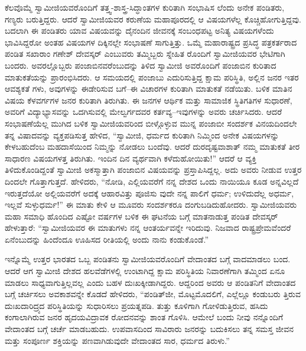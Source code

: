 ಕೆಲವೊಮ್ಮೆ ಸ್ವಾಮೀಜಿಯವರೊಂದಿಗೆ ತತ್ತ್ವ-ಶಾಸ್ತ್ರ-ಸಿದ್ಧಾಂತಗಳ ಕುರಿತಾಗಿ ಸಂಭಾಷಿಸ ಲೆಂದು ಅನೇಕ ಪಂಡಿತರು, ಗಣ್ಯರು ಬರುತ್ತಿದ್ದರು. ಆದರೆ ಸ್ವಾಮೀಜಿಯವರ ಕರುಣೆಯ ಮಹಾಪೂರದಲ್ಲಿ ಆ ವಿಷಯಗಳೆಲ್ಲ ಕೊಚ್ಚಿಹೋಗುತ್ತಿದ್ದವು. ಬದಲಾಗಿ ಈ ಪಂಡಿತರು ಯಾವ ವಿಷಯವನ್ನು ದೈನಂದಿನ ಜೀವನಕ್ಕೆ ಸಂಬಂಧಪಟ್ಟ ಅನಿತ್ಯ ವಿಷಯಗಳೆಂದು ಭಾವಿಸಿದ್ದರೋ ಅಂತಹ ವಿಷಯಗಳ ದಿಕ್ಕಿನಲ್ಲೇ ಸಂಭಾಷಣೆ ಸಾಗುತ್ತಿತ್ತು. ಒಮ್ಮೆ ಮಹಾರಾಷ್ಟ್ರದ ಪ್ರಸಿದ್ಧ ಪತ್ರಕರ್ತರಾದ ಪಂಡಿತ ಸಖಾರಾಂ ಗಣೇಶ್ ದೇವಸ್ಕರ್ ಎಂಬುವರು ತಮ್ಮಿಬ್ಬರು ಸ್ನೇಹಿತ ರೊಂದಿಗೆ ಸ್ವಾಮೀಜಿಯವರ ಭೇಟಿಗಾಗಿ ಬಂದರು. ಅವರಲ್ಲೊಬ್ಬರು ಪಂಜಾಬಿನವರೆಂಬುದನ್ನು ತಿಳಿದ ಸ್ವಾಮೀಜಿ ಅವರೊಂದಿಗೆ ಪಂಜಾಬಿನ ಕುರಿತಾದ ಮಾತುಕತೆಯನ್ನು ಪ್ರಾರಂಭಿಸಿದರು. ಆ ಸಮಯದಲ್ಲಿ ಪಂಜಾಬು ಎದುರಿಸುತ್ತಿದ್ದ ಕ್ಷಾಮ ಪರಿಸ್ಥಿತಿ, ಅಲ್ಲಿನ ಜನರ ಇತರ ಆವಶ್ಯಕತೆ ಗಳು, ಅವುಗಳನ್ನು ಈಡೇರಿಸುವ ಬಗೆ–ಈ ವಿಚಾರಗಳ ಕುರಿತಾಗಿ ಮಾತುಕತೆ ನಡೆಯಿತು. ಬಳಿಕ ಮಾತಿನ ವಿಷಯ ಕೆಳವರ್ಗಗಳ ಜನರ ಕುರಿತಾಗಿ ತಿರುಗಿತು. ಈ ಜನಗಳ ಆರ್ಥಿಕ ಮತ್ತು ಸಾಮಾಜಿಕ ಸ್ಥಿತಿಗತಿಗಳ ಸುಧಾರಣೆ, ಅವರಿಗೆ ವಿದ್ಯಾಭ್ಯಾಸವನ್ನು ಒದಗಿಸುವಲ್ಲಿ ಮೇಲ್ವರ್ಗದವರ ಕರ್ತವ್ಯ–ಇವುಗಳನ್ನು ಅವರು ಚರ್ಚಿಸಿದರು. ಆದರೆ ಸಂಭಾಷಣೆಯೆಲ್ಲ ಮುಗಿದ ಬಳಿಕ ಸ್ವಾಮೀಜಿಯವರಿಂದ ಬೀಳ್ಗೊಳ್ಳುವ ಮುನ್ನ ಪಂಜಾಬೀ ಸಂದರ್ಶಕ ವಿನಯದಿಂದಲೇ ತನ್ನ ವಿಷಾದವನ್ನು ವ್ಯಕ್ತಪಡಿಸುತ್ತ ಹೇಳಿದ, “ಸ್ವಾಮೀಜಿ, ಧರ್ಮದ ಕುರಿತಾಗಿ ನಿಮ್ಮಿಂದ ಅನೇಕ ವಿಷಯಗಳನ್ನು ಕೇಳಬಹುದೆಂಬ ಮಹದಾಸೆಯಿಂದ ನಿಮ್ಮನ್ನು ನೋಡಲು ಬಂದೆವು. ಆದರೆ ದುರದೃಷ್ಟವಾಶಾತ್ ನಮ್ಮ ಮಾತುಕತೆ ತೀರ ಸಾಧಾರಣ ವಿಷಯಗಳತ್ತ ತಿರುಗಿತು. ಇಂದಿನ ದಿನ ವ್ಯರ್ಥವಾಗಿ ಕಳೆದುಹೋಯಿತು!” ಆದರೆ ಆ ವ್ಯಕ್ತಿ ತಿಳಿದುಕೊಂಡಿದ್ದಂತೆ ಸ್ವಾಮೀಜಿ ಅಕಸ್ಮಾತ್ತಾಗಿ ಪಂಜಾಬಿನ ವಿಷಯವನ್ನು ಪ್ರಸ್ತಾಪಿಸಿದ್ದಲ್ಲ. ಅದು ಅವರು ನೀಡುವ ಉತ್ತರ ದಿಂದಲೇ ಗೊತ್ತಾಗುತ್ತದೆ. ಹೇಳಿದರು, “ನೋಡಿ, ಎಲ್ಲಿಯವರೆಗೆ ನನ್ನ ದೇಶದ ಒಂದು ನಾಯಿಯೂ ಕೂಡ ಅನ್ನವಿಲ್ಲದೆ ಇರುತ್ತದೆಯೋ ಅಲ್ಲಿಯವರೆಗೆ ಅದಕ್ಕೆ ಆಹಾರವಿತ್ತು ಪೂಜಿಸು ವುದೇ ನನ್ನ ಪಾಲಿಗೆ ಧರ್ಮ; ಉಳಿದುದೆಲ್ಲ ಅಧರ್ಮ, ಇಲ್ಲವೆ ಸುಳ್ಳುಧರ್ಮ!” ಈ ಮಾತು ಕೇಳಿ ಆ ಮೂವರು ಸಂದರ್ಶಕರೂ ದಂಗುಬಡಿದುಹೋದರು. ಸ್ವಾಮೀಜಿಯವರು ಮಹಾ ಸಮಾಧಿ ಹೊಂದಿದ ಎಷ್ಟೋ ವರ್ಷಗಳ ಬಳಿಕ ಈ ಘಟನೆಯ ಬಗ್ಗೆ ಮಾತನಾಡುತ್ತ ಪಂಡಿತ ದೇವಸ್ಕರ್ ಹೇಳುತ್ತಾರೆ: “ಸ್ವಾಮೀಜಿಯವರ ಈ ಮಾತುಗಳು ನನ್ನ ಆಂತರ್ಯವನ್ನೇ ಇರಿದುವು. ನಿಜವಾದ ರಾಷ್ಟ್ರಪ್ರೇಮವೆಂದರೆ ಏನೆಂಬುದನ್ನು ಹಿಂದೆಂದೂ ಊಹಿಸದ ರೀತಿಯಲ್ಲಿ ಅಂದು ನಾನು ಕಂಡುಕೊಂಡೆ.”

ಇನ್ನೊಮ್ಮೆ ಉತ್ತರ ಭಾರತದ ಒಬ್ಬ ಪಂಡಿತನು ಸ್ವಾಮೀಜಿಯವರೊಂದಿಗೆ ವೇದಾಂತದ ಬಗ್ಗೆ ವಾದಮಾಡಲು ಬಂದ. ಆದರೆ ಆಗ ಸ್ವಾಮೀಜಿ ದೇಶದ ಹಲವೆಡೆಗಳಲ್ಲಿ ಉಂಟಾಗಿದ್ದ ಕ್ಷಾಮ ಪರಿಸ್ಥಿತಿಯ ನಿವಾರಣೆಗಾಗಿ ತಮ್ಮಿಂದ ಏನೂ ಮಾಡಲು ಸಾಧ್ಯವಾಗುತ್ತಿಲ್ಲವಲ್ಲ ಎಂದು ಬಹಳ ದುಃಖಕ್ಕೀಡಾಗಿದ್ದರು. ಆದ್ದರಿಂದ ಅವರು ಆ ಪಂಡಿತನಿಗೆ ವೇದಾಂತದ ಬಗ್ಗೆ ಚರ್ಚಿಸಲು ಅವಕಾಶವನ್ನೇ ಕೊಡದೆ ಹೇಳಿದರು, “ಪಂಡಿತ್​ಜೀ, ಮೊಟ್ಟಮೊದಲಿಗೆ, ಎಲ್ಲೆಲ್ಲೂ ಕಂಡುಬರು ತ್ತಿರುವ ದುಃಖದಾರಿದ್ರ್ಯದ ಪರಿಸ್ಥಿತಿಯನ್ನು ಸುಧಾರಿಸಲು ಪ್ರಯತ್ನಪಡಿ. ತುತ್ತು ಕೂಳಿಗಾಗಿ ಗೋಳಿಡುತ್ತಿರುವ, ಹಸಿದು ಕಂಗಾಲಾಗಿರುವ ಜನರ ಹೃದಯವಿದ್ರಾವಕ ರೋದನವನ್ನು ಶಾಂತ ಗೊಳಿಸಿ. ಆಮೇಲೆ ಬಂದು ನೀವು ನನ್ನೊಂದಿಗೆ ವೇದಾಂತದ ಬಗ್ಗೆ ಚರ್ಚೆ ಮಾಡಬಹುದು. ಉಪವಾಸದಿಂದ ಸಾವಿರಾರು ಜನರನ್ನು ಬದುಕಿಸಲು ತನ್ನ ಸಮಸ್ತ ಜೀವನ ಮತ್ತು ಸಂಪೂರ್ಣ ಶಕ್ತಿಯನ್ನು ಪಣವಾಗಿಡುವುದೇ ವೇದಾಂತದ ಸಾರ, ಧರ್ಮದ ತಿರುಳು.”

